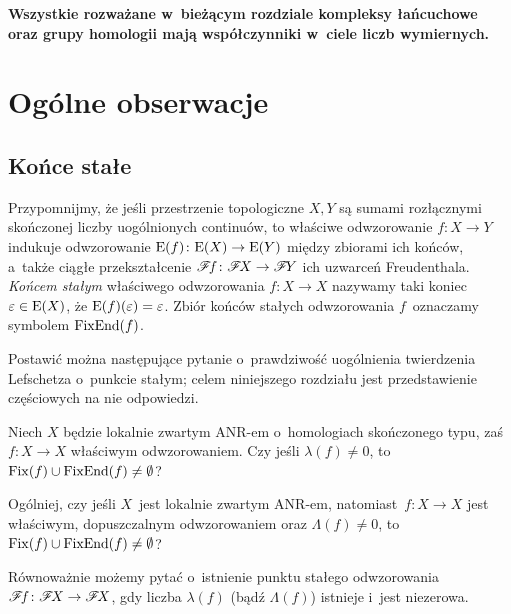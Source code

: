 \textbf{Wszystkie rozważane w~bieżącym rozdziale kompleksy łańcuchowe oraz grupy homologii mają współczynniki w~ciele liczb wymiernych.}

\section{Ogólne obserwacje}\label{sec-ogolne_obs}

\subsection{Końce stałe}
Przypomnijmy, że jeśli przestrzenie topologiczne $X, Y$ są sumami rozłącznymi skończonej liczby uogólnionych continuów, to właściwe odwzorowanie $f\colon X\to Y$ indukuje odwzorowanie $\mathrm{E}(f)\colon \mathrm{E}(X)\to \mathrm{E}(Y)$ między zbiorami ich końców, a~także ciągłe przekształcenie $\mathscr{F}\! f\colon \mathscr{F}\! X\to \mathscr{F}\! Y$ ich uzwarceń Freudenthala. \textit{Końcem stałym} właściwego odwzorowania $f\colon X\to X$ nazywamy taki koniec $\varepsilon\in \mathrm{E}(X)$, że $\mathrm{E}(f)(\varepsilon)=\varepsilon$. Zbiór końców stałych odwzorowania $f$~oznaczamy symbolem $\operatorname{FixEnd}(f)$.

Postawić można następujące pytanie o~prawdziwość uogólnienia twierdzenia Lefschetza o~punkcie stałym; celem niniejszego rozdziału jest przedstawienie częściowych na nie odpowiedzi.

\begin{problem}\label{PROBLEM-twierdzenie-lefschetza-o-punkcie-lub-koncu-stalym}
Niech $X$ będzie lokalnie zwartym ANR-em o~homologiach skończonego typu, zaś $f\colon X\to X$ właściwym odwzorowaniem. Czy jeśli $\lambda(f)\not=0$, to $\operatorname{Fix}(f)\cup\operatorname{FixEnd}(f)\not=\emptyset$?

Ogólniej, czy jeśli $X$~jest lokalnie zwartym ANR-em, natomiast~$f\colon X\to X$ jest właściwym, dopuszczalnym odwzorowaniem oraz $\Lambda(f)\not=0$, to $\operatorname{Fix}(f)\cup\operatorname{FixEnd}(f)\not=\emptyset$?
\end{problem}

Równoważnie możemy pytać o~istnienie punktu stałego odwzorowania $\mathscr{F}\! f\colon \mathscr{F}\! X\to \mathscr{F}\! X$, gdy liczba $\lambda(f)$ (bądź $\Lambda(f)$) istnieje i~jest niezerowa.

